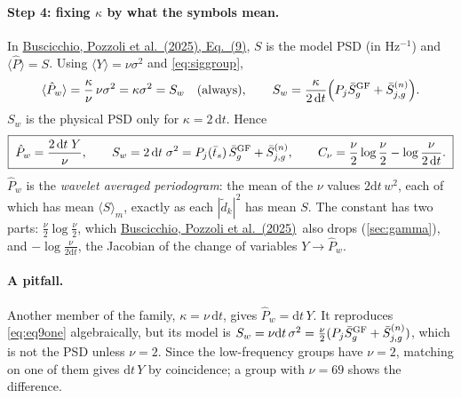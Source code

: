 \documentclass[11pt,a4paper]{article}
\newcommand{\urlPone}{https://arxiv.org/pdf/2511.03604}
\newcommand{\Pone}{\href{\urlPone}{Buscicchio, Pozzoli et al.~(2025)}}
\newcommand{\PoneEq}[1]{\href{\urlPone}{Buscicchio, Pozzoli et al.~(2025), Eq.~(#1)}}
\newcommand{\dd}{\mathrm{d}}
\newcommand{\Pbar}{\hat{P}}
\begin{document}
\paragraph{Step 4: fixing $\kappa$ by what the symbols mean.} In \PoneEq{9}, $S$ is
the model PSD (in Hz$^{-1}$) and $\langle\Pbar\rangle=S$. Using
$\langle Y\rangle=\nu\sigma^2$ and \cref{eq:siggroup},
\[
  \langle\Pbar_w\rangle = \frac{\kappa}{\nu}\,\nu\sigma^2 = \kappa\sigma^2 = S_w
  \quad\text{(always)},\qquad
  S_w = \frac{\kappa}{2\,\dd t}\Big(P_j\bar S^{\rm GF}_g + \bar S^{(n)}_{j,g}\Big).
\]
$S_w$ is the physical PSD only for $\kappa=2\,\dd t$. Hence
\begin{equation}
  \boxed{\;\Pbar_w = \frac{2\,\dd t\;Y}{\nu},\qquad
  S_w = 2\,\dd t\;\sigma^2 = P_j(\bar t_s)\,\bar S^{\rm GF}_g + \bar S^{(n)}_{j,g},\qquad
  C_\nu = \frac\nu2\log\frac\nu2 - \log\frac{\nu}{2\,\dd t}.\;}
\end{equation}
$\Pbar_w$ is the \emph{wavelet averaged periodogram}: the mean of the $\nu$ values
$2\dd t\,w^2$, each of which has mean $\langle S\rangle_m$, exactly as each
$|\tilde d_k|^2$ has mean $S$. The constant has two parts: $\frac\nu2\log\frac\nu2$,
which \Pone\ also drops (\cref{sec:gamma}), and $-\log\frac{\nu}{2\dd t}$, the Jacobian
of the change of variables $Y\to\Pbar_w$.

\paragraph{A pitfall.} Another member of the family, $\kappa=\nu\,\dd t$, gives
$\Pbar_w=\dd t\,Y$. It reproduces \cref{eq:eq9one} algebraically, but its model is
$S_w=\nu\dd t\,\sigma^2=\frac\nu2(P_j\bar S^{\rm GF}_g+\bar S^{(n)}_{j,g})$, which is not the
PSD unless $\nu=2$. Since the low-frequency groups have $\nu=2$, matching on one of them
gives $\dd t\,Y$ by coincidence; a group with $\nu=69$ shows the difference.
\end{document}
